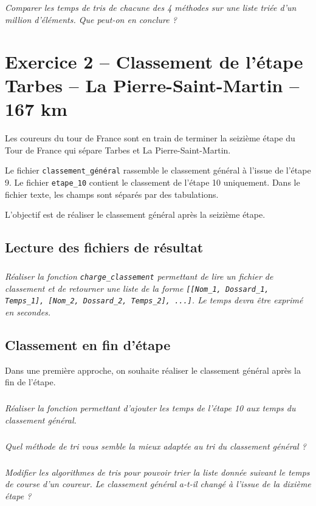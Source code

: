 \documentclass[10pt,fleqn]{article} %
\begin{document}
\begin{multicols}{2}
\subparagraph{}
\textit{Comparer les temps de tris de chacune des 4 méthodes sur une liste triée d'un million d'éléments. Que peut-on en conclure ?}




\section*{Exercice 2 -- Classement de l'étape Tarbes -- La Pierre-Saint-Martin -- 167 km}
Les coureurs du tour de France sont en train de terminer la seizième étape du Tour de France qui sépare Tarbes et La Pierre-Saint-Martin. 

Le fichier \texttt{classement\_général} rassemble le classement général à l'issue de l'étape 9. Le fichier \texttt{etape\_10} contient le classement de l'étape 10 uniquement. Dans le fichier texte, les champs sont séparés par des tabulations.


\begin{obj}
L'objectif est de réaliser le classement général après la seizième étape. 
\end{obj}

\subsection*{Lecture des fichiers de résultat}
\setcounter{exo}{0}
\subparagraph{}
\textit{Réaliser la fonction \texttt{charge\_classement} permettant de lire un fichier de classement 
et de retourner une liste de la forme \texttt{[[Nom\_1, Dossard\_1, Temps\_1], [Nom\_2, Dossard\_2, Temps\_2], ...]}. Le temps devra être exprimé en secondes.}



\subsection*{Classement en fin d'étape}
Dans une première approche, on souhaite réaliser le classement général après la fin de l'étape. 

\subparagraph{}
\textit{Réaliser la fonction permettant d'ajouter les temps de l'étape 10 aux temps du classement général.}

\subparagraph{}
\textit{Quel méthode de tri vous semble la mieux adaptée au tri du classement général ?}

\subparagraph{}
\textit{Modifier les algorithmes de tris pour pouvoir trier la liste donnée suivant le temps de course d'un coureur. Le classement général a-t-il changé à l'issue de la dixième étape ?}


\end{multicols}
\end{document}
